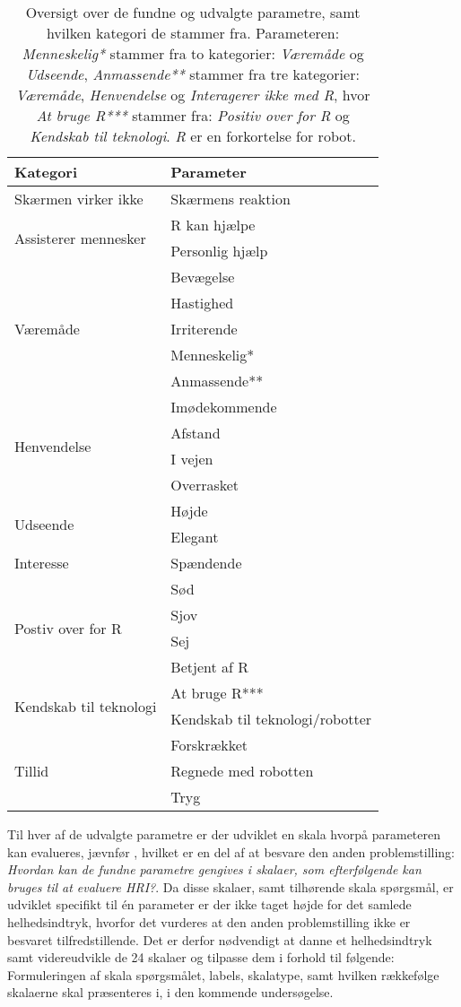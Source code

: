 \begin{table}[H]
	\centering
	\begin{tabular}{ l|l }
		\centering
		Kategori & Parameter\\ \hline
		Skærmen virker ikke & Skærmens reaktion\\ \hline
		\multirow{2}{*}{Assisterer mennesker} & R kan hjælpe \\
		& Personlig hjælp \\ \hline
		\multirow{5}{*}{Væremåde} & Bevægelse \\
		& Hastighed \\
		& Irriterende \\
		& Menneskelig* \\
		& Anmassende** \\ \hline
		\multirow{4}{*}{Henvendelse} & Imødekommende \\
		& Afstand \\
		& I vejen \\
		& Overrasket\\ \hline
		\multirow{2}{*}{Udseende} & Højde \\
		& Elegant \\ \hline
		Interesse & Spændende\\ \hline
		\multirow{4}{*}{Postiv over for R} & Sød \\
		& Sjov \\
		& Sej \\
		& Betjent af R\\ \hline
		\multirow{2}{*}{Kendskab til teknologi} & At bruge R*** \\
		& Kendskab til teknologi/robotter \\ \hline
		\multirow{3}{*}{Tillid} & Forskrækket \\
		& Regnede med robotten \\
		& Tryg
	\end{tabular}
	\caption{Oversigt over de fundne og udvalgte parametre, samt hvilken kategori de stammer fra. Parameteren: \textit{Menneskelig*} stammer fra to kategorier: \textit{Væremåde} og \textit{Udseende}, \textit{Anmassende**} stammer fra tre kategorier: \textit{Væremåde}, \textit{Henvendelse} og \textit{Interagerer ikke med R}, hvor \textit{At bruge R***} stammer fra: \textit{Positiv over for R} og \textit{Kendskab til teknologi}. \textit{R} er en forkortelse for robot.}
	\label{tab:OversigtOverValgteParametre}
\end{table}
\noindent
%
Til hver af de udvalgte parametre er der udviklet en skala hvorpå parameteren kan evalueres, jævnfør , hvilket er en del af at besvare den anden problemstilling: \textit{Hvordan kan de fundne parametre gengives i skalaer, som efterfølgende kan bruges til at evaluere HRI?}. Da disse skalaer, samt tilhørende skala spørgsmål, er udviklet specifikt til én parameter er der ikke taget højde for det samlede helhedsindtryk, hvorfor det vurderes at den anden problemstilling ikke er besvaret tilfredstillende. Det er derfor nødvendigt at danne et helhedsindtryk samt videreudvikle de 24 skalaer og tilpasse dem i forhold til følgende: Formuleringen af skala spørgsmålet, labels, skalatype, samt hvilken rækkefølge skalaerne skal præsenteres i, i den kommende undersøgelse.    
